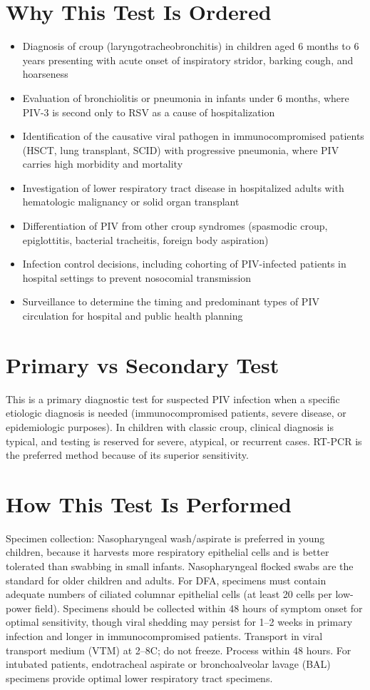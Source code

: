 \section*{Why This Test Is Ordered}
\begin{itemize}
  \item Diagnosis of croup (laryngotracheobronchitis) in children aged 6 months to 6 years presenting with acute onset of inspiratory stridor, barking cough, and hoarseness
  \item Evaluation of bronchiolitis or pneumonia in infants under 6 months, where PIV-3 is second only to RSV as a cause of hospitalization
  \item Identification of the causative viral pathogen in immunocompromised patients (HSCT, lung transplant, SCID) with progressive pneumonia, where PIV carries high morbidity and mortality
  \item Investigation of lower respiratory tract disease in hospitalized adults with hematologic malignancy or solid organ transplant
  \item Differentiation of PIV from other croup syndromes (spasmodic croup, epiglottitis, bacterial tracheitis, foreign body aspiration)
  \item Infection control decisions, including cohorting of PIV-infected patients in hospital settings to prevent nosocomial transmission
  \item Surveillance to determine the timing and predominant types of PIV circulation for hospital and public health planning
\end{itemize}

\section*{Primary vs Secondary Test}
This is a primary diagnostic test for suspected PIV infection when a specific etiologic diagnosis is needed (immunocompromised patients, severe disease, or epidemiologic purposes). In children with classic croup, clinical diagnosis is typical, and testing is reserved for severe, atypical, or recurrent cases. RT-PCR is the preferred method because of its superior sensitivity.

\section*{How This Test Is Performed}
Specimen collection: Nasopharyngeal wash/aspirate is preferred in young children, because it harvests more respiratory epithelial cells and is better tolerated than swabbing in small infants. Nasopharyngeal flocked swabs are the standard for older children and adults. For DFA, specimens must contain adequate numbers of ciliated columnar epithelial cells (at least 20 cells per low-power field). Specimens should be collected within 48 hours of symptom onset for optimal sensitivity, though viral shedding may persist for 1--2 weeks in primary infection and longer in immunocompromised patients. Transport in viral transport medium (VTM) at 2--8\textdegree{}C; do not freeze. Process within 48 hours. For intubated patients, endotracheal aspirate or bronchoalveolar lavage (BAL) specimens provide optimal lower respiratory tract specimens.

